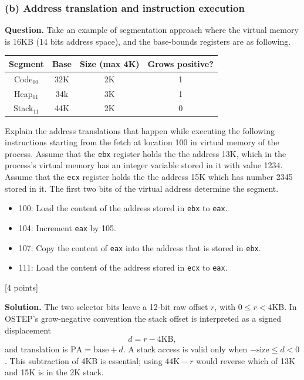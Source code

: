 \subsubsection*{(b) Address translation and instruction execution}
\textbf{Question.} Take an example of segmentation approach where the virtual
memory is 16KB (14 bits address space), and the base-bounds registers are as
following.
\begin{center}
\begin{tabular}{c|c|c|c}
\textbf{Segment} & \textbf{Base} & \textbf{Size (max 4K)}
& \textbf{Grows positive?}\\ \hline
Code\(_{00}\)  & 32K & 2K & 1\\
Heap\(_{01}\)  & 34k & 3K & 1\\
Stack\(_{11}\) & 44K & 2K & 0
\end{tabular}
\end{center}
Explain the address translations that happen while executing the following
instructions starting from the fetch at location 100 in virtual memory of the
process. Assume that the \texttt{ebx} register holds the the address 13K,
which in the process's virtual memory has an integer variable stored in it with
value 1234. Assume that the \texttt{ecx} register holds the the address 15K
which has number 2345 stored in it. The first two bits of the virtual address
determine the segment.
\begin{itemize}
  \item 100: Load the content of the address stored in \texttt{ebx} to
        \texttt{eax}.
  \item 104: Increment \texttt{eax} by 105.
  \item 107: Copy the content of \texttt{eax} into the address that is stored
        in \texttt{ebx}.
  \item 111: Load the content of the address stored in \texttt{ecx} to
        \texttt{eax}.
\end{itemize}
\hfill [4 points]

\textbf{Solution.}
The two selector bits leave a 12-bit raw offset \(r\), with
\(0\leq r<4\)KB.  In OSTEP's grow-negative convention the stack offset is
interpreted as a signed displacement
\[
 d=r-4\text{KB},
\]
and translation is \(\mathrm{PA}=\mathrm{base}+d\).  A stack access is valid
only when \(-\mathrm{size}\leq d<0\).  This subtraction of 4KB is essential;
using \(44\text{K}-r\) would reverse which of 13K and 15K is in the 2K stack.

